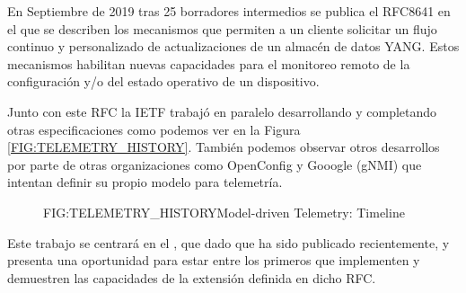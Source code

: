 En Septiembre de 2019 tras 25 borradores intermedios se publica el \ac{RFC}8641 en el que se describen los mecanismos que permiten a un cliente solicitar un flujo continuo y personalizado de actualizaciones de un almacén de datos YANG. Estos mecanismos habilitan nuevas capacidades para el monitoreo remoto de la configuración y/o del estado operativo de un dispositivo\cite{RFC8641}.

Junto con este \ac{RFC} la \ac{IETF} trabajó en paralelo desarrollando y completando otras especificaciones como podemos ver en la Figura \ref{FIG:TELEMETRY_HISTORY}. También podemos observar otros desarrollos por parte de otras organizaciones como OpenConfig y Gooogle (gNMI) que intentan definir su propio modelo para telemetría.


\begin{figure}[Model-driven Telemetry: Timeline]{FIG:TELEMETRY_HISTORY}{Model-driven Telemetry: Timeline}
\end{figure}



Este trabajo se centrará en el \cite{RFC8641}, que dado que ha sido publicado recientemente, y presenta una oportunidad para estar entre los primeros que implementen y demuestren las capacidades de la extensión definida en dicho \ac{RFC}.